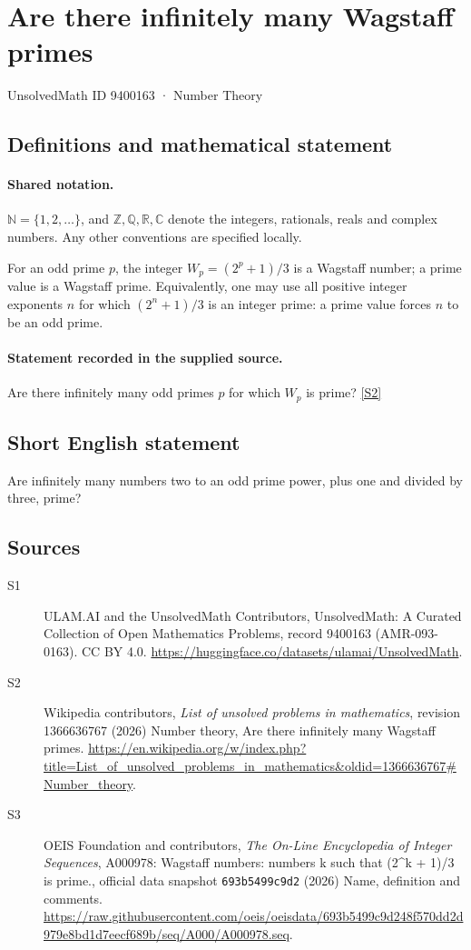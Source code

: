 \documentclass[11pt]{article}
\newcommand{\sref}[2]{\hyperlink{source:#1:#2}{[S#2]}}
\begin{document}
\setcounter{section}{9400162}
\section{Are there infinitely many Wagstaff primes}\label{9400163}
{\small\sffamily UnsolvedMath ID 9400163 · Number Theory}
\subsection{Definitions and mathematical statement}

\paragraph{Shared notation.}$\mathbb N=\{1,2,\ldots\}$, and $\mathbb Z,\mathbb Q,\mathbb R,\mathbb C$ denote the integers, rationals, reals and complex numbers. Any other conventions are specified locally.


For an odd prime $p$, the integer $W_p=(2^p+1)/3$ is a Wagstaff number; a prime value is a Wagstaff prime. Equivalently, one may use all positive integer exponents $n$ for which $(2^n+1)/3$ is an integer prime: a prime value forces $n$ to be an odd prime.
\paragraph{Statement recorded in the supplied source.}
Are there infinitely many odd primes $p$ for which $W_p$ is prime? \sref{9400163}{2}
\subsection{Short English statement}
Are infinitely many numbers two to an odd prime power, plus one and divided by three, prime?
\subsection{Sources}
\begin{description}
\item[\hypertarget{source:9400163:1}{S1}] ULAM.AI and the UnsolvedMath Contributors, UnsolvedMath: A Curated Collection of Open Mathematics Problems, record 9400163 (AMR-093-0163). CC BY 4.0. \url{https://huggingface.co/datasets/ulamai/UnsolvedMath}.
\item[\hypertarget{source:9400163:2}{S2}] Wikipedia contributors, \emph{List of unsolved problems in mathematics}, revision 1366636767 (2026) Number theory, Are there infinitely many Wagstaff primes. \url{https://en.wikipedia.org/w/index.php?title=List_of_unsolved_problems_in_mathematics&oldid=1366636767#Number_theory}.
\item[\hypertarget{source:9400163:3}{S3}] OEIS Foundation and contributors, \emph{The On-Line Encyclopedia of Integer Sequences}, A000978: Wagstaff numbers: numbers k such that (2\textasciicircum{}k + 1)/3 is prime., official data snapshot \texttt{693b5499c9d2} (2026) Name, definition and comments. \url{https://raw.githubusercontent.com/oeis/oeisdata/693b5499c9d248f570dd2d979e8bd1d7eecf689b/seq/A000/A000978.seq}.
\end{description}
\label{end:9400163}
\end{document}
